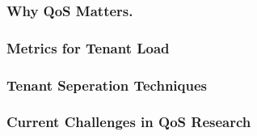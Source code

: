 
\subsubsection{Why QoS Matters.}

\subsubsection{Metrics for Tenant Load}

\subsubsection{Tenant Seperation Techniques}

\subsubsection{Current Challenges in QoS Research}

